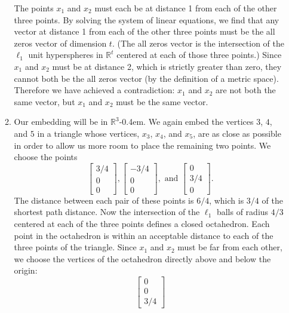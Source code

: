 \documentclass{article}
\newcommand{\R}{\mathbb{R}}
\newcommand{\1}{\mathbf{1}}
\newcommand{\0}{\mathbf{0}}
\begin{document}
\begin{enumerate}
\begin{enumerate}
        The points $x_1$ and $x_2$ must each be at distance 1 from each of the other three points.
        By solving the system of linear equations, we find that any vector at distance 1 from each of the other three points must be the all zeros vector of dimension $t$.
        (The all zeros vector is the intersection of the $\ell_1$ unit hyperspheres in $\R^t$ centered at each of those three points.)
        Since $x_1$ and $x_2$ must be at distance 2, which is strictly greater than zero, they cannot both be the all zeros vector (by the definition of a metric space).
        Therefore we have achieved a contradiction: $x_1$ and $x_2$ are not both the same vector, but $x_1$ and $x_2$ must be the same vector.

      \item
        Our embedding will be in $\R^3$\kern-0.4em.
        We again embed the vertices $3$, $4$, and $5$ in a triangle whose vertices, $x_3$, $x_4$, and $x_5$, are as close as possible in order to allow us more room to place the remaining two points.
        We choose the points
        \begin{equation*}
          \begin{bmatrix}
            3/4 \\ 0 \\ 0
          \end{bmatrix},
          \begin{bmatrix}
            -3/4 \\ 0 \\ 0
          \end{bmatrix}, \text{ and }
          \begin{bmatrix}
            0 \\ 3/4 \\ 0
          \end{bmatrix}.
        \end{equation*}
        The distance between each pair of these points is $6/4$, which is $3 / 4$ of the shortest path distance.
        Now the intersection of the $\ell_1$ balls of radius $4/3$ centered at each of the three points defines a closed octahedron.
        Each point in the octahedron is within an acceptable distance to each of the three points of the triangle.
        Since $x_1$ and $x_2$ must be far from each other, we choose the vertices of the octahedron directly above and below the origin:
        \begin{equation*}
          \begin{bmatrix}
            0 \\ 0 \\ 3/4

\end{bmatrix}
\end{equation*}
\end{enumerate}
\end{enumerate}
\end{document}

